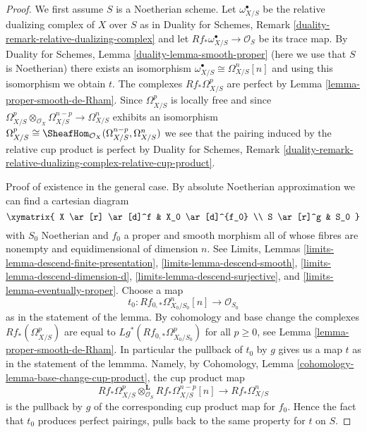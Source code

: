\begin{proof}
We first assume $S$ is a Noetherian scheme.
Let $\omega^\bullet_{X/S}$ be the relative dualizing complex of $X$ over $S$ as
in Duality for Schemes, Remark \ref{duality-remark-relative-dualizing-complex}
and let $Rf_*\omega_{X/S}^\bullet \to \mathcal{O}_S$ be its trace map. By
Duality for Schemes, Lemma \ref{duality-lemma-smooth-proper}
(here we use that $S$ is Noetherian)
there exists an isomorphism $\omega^\bullet_{X/S} \cong \Omega^n_{X/S}[n]$
and using this isomorphism we obtain $t$. The complexes $Rf_*\Omega^p_{X/S}$
are perfect by Lemma \ref{lemma-proper-smooth-de-Rham}.
Since $\Omega^p_{X/S}$ is locally free and since
$\Omega^p_{X/S} \otimes_{\mathcal{O}_X} \Omega^{n - p}_{X/S} \to
\Omega^n_{X/S}$ exhibits an isomorphism $\Omega^p_{X/S} \cong
\SheafHom_{\mathcal{O}_X}(\Omega^{n - p}_{X/S}, \Omega^n_{X/S})$
we see that the pairing induced by the relative cup product is perfect by
Duality for Schemes, Remark
\ref{duality-remark-relative-dualizing-complex-relative-cup-product}.

\medskip\noindent
Proof of existence in the general case.
By absolute Noetherian approximation we can find a cartesian diagram
$$
\xymatrix{
X \ar[r] \ar[d]^f & X_0 \ar[d]^{f_0} \\
S \ar[r]^g & S_0
}
$$
with $S_0$ Noetherian and $f_0$ a proper and smooth morphism
all of whose fibres are nonempty and equidimensional of dimension $n$.
See Limits, Lemmas \ref{limits-lemma-descend-finite-presentation},
\ref{limits-lemma-descend-smooth}, \ref{limits-lemma-descend-dimension-d},
\ref{limits-lemma-descend-surjective}, and
\ref{limits-lemma-eventually-proper}. Choose a map
$$
t_0 : Rf_{0, *}\Omega^n_{X_0/S_0}[n] \longrightarrow \mathcal{O}_{S_0}
$$
as in the statement of the lemma. By cohomology and base change the
complexes $Rf_*(\Omega^p_{X/S})$ are equal to
$Lg^*(Rf_{0, *}\Omega^p_{X_0/S_0})$ for all $p \geq 0$, see
Lemma \ref{lemma-proper-smooth-de-Rham}. In particular the pullback
of $t_0$ by $g$ gives us a map $t$ as in the statement of the lemmma.
Namely, by Cohomology, Lemma \ref{cohomology-lemma-base-change-cup-product},
the cup product map
$$
Rf_*\Omega^p_{X/S}
\otimes_{\mathcal{O}_S}^\mathbf{L}
Rf_*\Omega^{n - p}_{X/S}[n]
\longrightarrow
Rf_*\Omega^n_{X/S}
$$
is the pullback by $g$ of the corresponding cup product map for $f_0$.
Hence the fact that $t_0$ produces perfect pairings, pulls back to
the same property for $t$ on $S$.


\end{proof}
